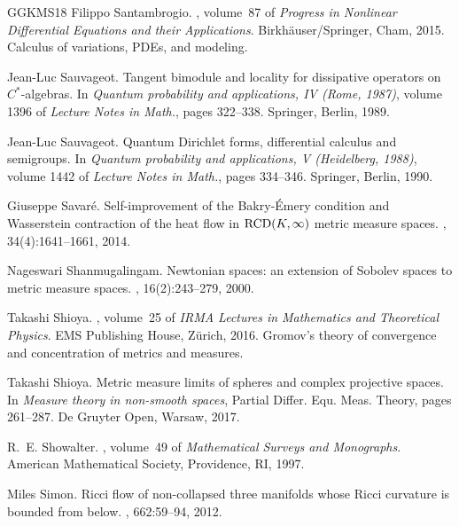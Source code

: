 \documentclass[11pt]{article}
\numberwithin{equation}{section}
\begin{document}
{\begin{thebibliography}{GGKMS18}
Filippo Santambrogio.
, volume~87 of {\em
  Progress in Nonlinear Differential Equations and their Applications}.
\newblock Birkh\"auser/Springer, Cham, 2015.
\newblock Calculus of variations, PDEs, and modeling.

Jean-Luc Sauvageot.
\newblock Tangent bimodule and locality for dissipative operators on
  {$C^*$}-algebras.
\newblock In {\em Quantum probability and applications, {IV} ({R}ome, 1987)},
  volume 1396 of {\em Lecture Notes in Math.}, pages 322--338. Springer,
  Berlin, 1989.

Jean-Luc Sauvageot.
\newblock Quantum {D}irichlet forms, differential calculus and semigroups.
\newblock In {\em Quantum probability and applications, {V} ({H}eidelberg,
  1988)}, volume 1442 of {\em Lecture Notes in Math.}, pages 334--346.
  Springer, Berlin, 1990.

Giuseppe Savar{\'e}.
\newblock Self-improvement of the {B}akry-\'{E}mery condition and {W}asserstein
  contraction of the heat flow in {${\rm RCD}(K,\infty)$} metric measure
  spaces.
, 34(4):1641--1661, 2014.

Nageswari Shanmugalingam.
\newblock Newtonian spaces: an extension of {S}obolev spaces to metric measure
  spaces.
, 16(2):243--279, 2000.

Takashi Shioya.
, volume~25 of {\em IRMA Lectures in
  Mathematics and Theoretical Physics}.
\newblock EMS Publishing House, Z\"{u}rich, 2016.
\newblock Gromov's theory of convergence and concentration of metrics and
  measures.

Takashi Shioya.
\newblock Metric measure limits of spheres and complex projective spaces.
\newblock In {\em Measure theory in non-smooth spaces}, Partial Differ. Equ.
  Meas. Theory, pages 261--287. De Gruyter Open, Warsaw, 2017.

R.~E. Showalter.
, volume~49 of {\em Mathematical Surveys and
  Monographs}.
\newblock American Mathematical Society, Providence, RI, 1997.

Miles Simon.
\newblock Ricci flow of non-collapsed three manifolds whose {R}icci curvature
  is bounded from below.
, 662:59--94, 2012.


\end{thebibliography}}
\end{document}
